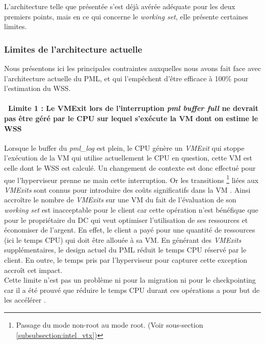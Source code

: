 \noindent L'architecture telle que présentée s'est déjà avérée adéquate pour les deux premiers points, mais en ce qui concerne le \textit{working set}, elle présente certaines limites.

\subsubsection{Limites de l'architecture actuelle}
Nous présentons ici les principales contraintes auxquelles nous avons fait face avec l'architecture actuelle du PML, et qui l'empêchent d'être efficace à 100\% pour l'estimation du WSS.

\paragraph{\textbullet\ \textbf{Limite 1 : Le VMExit lors de l'interruption \textit{pml buffer full} ne devrait pas être géré par le CPU sur lequel s'exécute la VM dont on estime le WSS}}
\par\noindent
\par\noindent Lorsque le buffer du \textit{pml\_log} est plein, le CPU génère un \textit{VMExit} qui stoppe l'exécution de la VM qui utilise actuellement le CPU en question, cette VM est celle dont le WSS est calculé. Un changement de contexte est donc effectué pour que l'hyperviseur prenne ne main cette interruption. Or les transitions \footnote{Passage du mode non-root au mode root. (Voir sous-section \ref{subsubsection:intel_vtx})} liées aux \textit{VMExits} sont connus pour introduire des coûts significatifs dans la VM \cite{overhead_VMExit}. Ainsi accroître le nombre de \textit{VMExits} sur une VM du fait de l'évaluation de son \textit{working set} est inacceptable pour le client car cette opération n'est bénéfique que pour le propriétaire du DC qui veut optimiser l'utilisation de ses ressources et économiser de l'argent. En effet, le client a payé pour une quantité de ressources (ici le temps CPU) qui doit être allouée à sa VM. En générant des \textit{VMExits} supplémentaires, le design actuel du PML réduit le temps CPU réservé par le client. En outre, le temps pris par l'hyperviseur pour capturer cette exception accroît cet impact.\\
Cette limite n'est pas un problème ni pour la migration ni pour le checkpointing car il a été prouvé que réduire le temps CPU durant ces opérations a pour but de les accélérer \cite{cpu_time_migration}.

